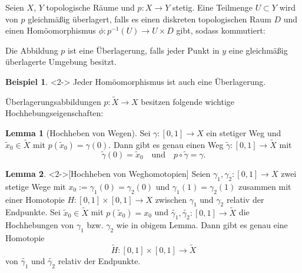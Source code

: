 \documentclass{beamer}
\newcommand{\R}{\mathbb{R}} %
\newcommand{\I}{\left[0,1\right]} %
\renewcommand{\emph}[1]{\textcolor{Emph}{#1}}
\theoremstyle{definition}
\newtheorem*{bsp}{Beispiel}
\newtheorem*{lem}{Lemma}
\begin{document}
\begin{frame}
  \begin{definition}
    Seien $X$, $Y$ topologische Räume und $p : X \to Y$ stetig. Eine Teilmenge $U \subset Y$ wird von $p$ \emph{gleichmäßig überlagert}, falls es einen diskreten topologischen Raum $D$ und einen Homöomorphismus $\phi : p^{-1}(U) \to U \times D$ gibt, sodass kommutiert:
    \begin{center}
    \end{center}

    Die Abbildung $p$ ist eine \emph{Überlagerung}, falls jeder Punkt in $y$ eine gleichmäßig überlagerte Umgebung besitzt.
  \end{definition}

  \begin{bsp}<2->
    Jeder Homöomorphismus ist auch eine Überlagerung.
  \end{bsp}
\end{frame}


\begin{frame}
  Überlagerungsabbildungen $p : \tilde{X} \to X$ besitzen folgende wichtige Hochhebungseigenschaften:

  \begin{lem}[Hochheben von Wegen]
    Sei $\gamma : \I \to X$ ein stetiger Weg und $\tilde{x}_0 \in \tilde{X}$ mit $p(\tilde{x}_0) = \gamma(0)$.
    Dann gibt es genau einen Weg $\tilde{\gamma} : \I \to \tilde{X}$ mit
    \[
      \tilde{\gamma}(0) = \tilde{x}_0
      \quad \text{und} \quad
      p \circ \tilde{\gamma} = \gamma.
    \]
  \end{lem}

  \begin{lem}<2->[Hochheben von Weghomotopien]
    Seien $\gamma_1, \gamma_2 : \I \to X$ zwei stetige Wege mit $x_0 := \gamma_1(0) = \gamma_2(0)$ und $\gamma_1(1) = \gamma_2(1)$ zusammen mit einer Homotopie $H : \I \times \I \to X$ zwischen $\gamma_1$ und $\gamma_2$ relativ der Endpunkte. Sei $\tilde{x}_0 \in \tilde{X}$ mit $p(\tilde{x}_0) = x_0$ und $\tilde{\gamma_1}, \tilde{\gamma_2} : \I \to \tilde{X}$ die Hochhebungen von $\gamma_1$ bzw. $\gamma_2$ wie in obigem Lemma. Dann gibt es genau eine Homotopie
    \[ \tilde{H} : \I \times \I \to \tilde{X} \]
    von $\tilde{\gamma_1}$ und $\tilde{\gamma_2}$ relativ der Endpunkte.
  \end{lem}
\end{frame}
\end{document}
